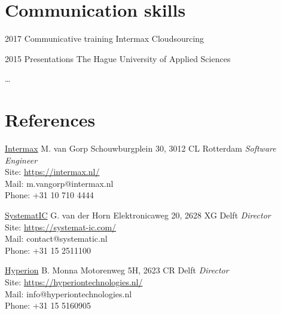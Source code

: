 \documentclass[]{friggeri-cv}
\begin{document}

\section{Communication skills}

\begin{entrylist}


\entry
{2017}
{Communicative training}
{Intermax Cloudsourcing}


\entry
{2015}
{Presentations}
{The Hague University of Applied Sciences}


\end{entrylist}

\ldots{}

\newpage{}


\section{References}

\begin{entrylist}

\entry
{\href{https://intermax.nl}{Intermax}}
{M. van Gorp}
{Schouwburgplein 30, 3012 CL Rotterdam }
{\emph{Software Engineer} \\
Site: \href{https://intermax.nl}{https://intermax.nl/} \\
Mail: m.vangorp@intermax.nl \\
Phone: +31 10 710 4444}

\entry
{\href{https://systemat-ic.com}{SystematIC}}
{G. van der Horn}
{Elektronicaweg 20, 2628 XG Delft}
{\emph{Director} \\
Site: \href{https://systemat-ic.com/}{https://systemat-ic.com/} \\
Mail: contact@systematic.nl \\
Phone: +31 15 2511100}

\entry
{\href{https://hyperiontechnologies.nl/}{Hyperion}}
{B. Monna}
{Motorenweg 5H, 2623 CR Delft}
{\emph{Director} \\
Site: \href{https://hyperiontechnologies.nl/}{https://hyperiontechnologies.nl/} \\
Mail: info@hyperiontechnologies.nl \\
Phone: +31 15 5160905}

\end{entrylist}

\end{document}
